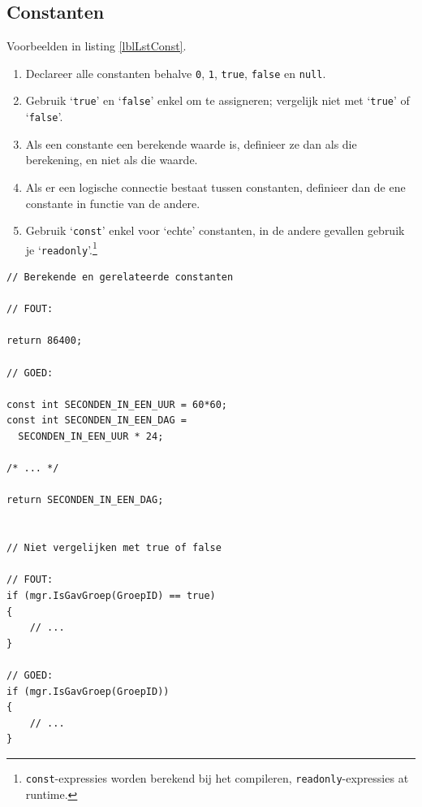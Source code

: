 \documentclass[a4paper,11pt]{article}
\begin{document}
\subsection{Constanten}
Voorbeelden in listing \ref{lblLstConst}.
\begin{enumerate}[resume]
\item Declareer alle constanten behalve  \lstinline !0!, \lstinline !1!,
\lstinline !true!, \lstinline !false! en \lstinline !null!. 
\item Gebruik `\lstinline !true!' en `\lstinline !false!' enkel om te
assigneren; vergelijk niet met `\lstinline !true!' of
`\lstinline !false!'.
\item Als een constante een berekende waarde is, definieer ze dan als die
berekening, en niet als die waarde.
\item Als er een logische connectie bestaat tussen constanten, definieer
dan de ene constante in functie van de andere.
\item Gebruik `\lstinline !const!' enkel voor `echte' constanten, in de
andere gevallen gebruik je 
`\lstinline !readonly!'.\footnote{\lstinline !const!-expressies worden
berekend bij het compileren, \lstinline !readonly!-expressies at runtime.} 
\end{enumerate}
\begin{lstlisting}[float, caption=Constanten, label=lblLstConst]
// Berekende en gerelateerde constanten

// FOUT:

return 86400;

// GOED:

const int SECONDEN_IN_EEN_UUR = 60*60;
const int SECONDEN_IN_EEN_DAG =
  SECONDEN_IN_EEN_UUR * 24;

/* ... */

return SECONDEN_IN_EEN_DAG;


// Niet vergelijken met true of false

// FOUT:
if (mgr.IsGavGroep(GroepID) == true)
{
	// ...
}

// GOED:
if (mgr.IsGavGroep(GroepID))
{
	// ...
}

\end{lstlisting}
\end{document}
